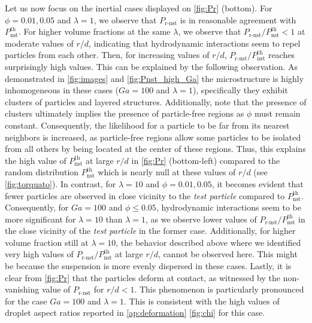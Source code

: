 Let us now focus on the inertial cases displayed on \ref{fig:Pr} (bottom). 
For $\phi = 0.01, 0.05$ and $\lambda=1$, we observe that $P_\text{r-nst}$ is in reasonable agreement with $P_\text{nst}^\text{th}$.  
For higher volume fractions at the same $\lambda$, we observe that $P_\text{r-nst}/P_\text{nst}^\text{th} < 1$ at moderate values of $r/d$,  indicating that hydrodynamic interactions seem to repel particles from each other. 
Then, for increasing values of $r/d$, $P_\text{r-nst}/P_\text{nst}^\text{th}$ reaches surprisingly high values.  
This can be explained by the following observation. 
As demonstrated in \ref{fig:images} and \ref{fig:Pnst_high_Ga} the microstructure is highly inhomogeneous in these cases ($Ga =100$ and $\lambda =1$), specifically they exhibit clusters of particles and layered structures.
Additionally, note that the presence of clusters ultimately implies the presence of particle-free regions as $\phi$ must remain constant. 
Consequently, the likelihood for a particle to be far from its nearest neighbors is increased, as particle-free regions allow some particles to be isolated from all others by being located at the center of these regions.
Thus, this explains the high value of $P_\text{nst}^\text{th}$ at large $r/d$ in \ref{fig:Pr} (bottom-left) compared to the random distribution $P_\text{nst}^\text{th}$ which is nearly null at these values of $r/d$ (see \ref{fig:torquato}). 
In contrast, for  $\lambda = 10$ and $\phi=0.01,0.05$, it becomes evident that fewer particles are observed in close vicinity to the \textit{test particle} compared to $P_\text{nst}^\text{th}$. 
Consequently, for $Ga = 100$ and $\phi \le 0.05$, hydrodynamic interactions seem to be more significant for $\lambda=10$ than $\lambda=1$, as we observe lower values of $P_\text{r-nst}/P_\text{nst}^\text{th}$ in the close vicinity of the \textit{test particle} in the former case.
Additionally, for higher volume fraction still at $\lambda = 10$, the behavior described above where we identified very high values of $P_\text{r-nst}/P_\text{nst}^\text{th}$ at large $r/d$, cannot be observed here.
This might be because the suspension is more evenly dispersed in these cases.  
Lastly, it is clear from \ref{fig:Pr} that the particles deform at contact, as witnessed by the non-vanishing value of $P_\text{r-nst}$ for $r/d<1$.
This phenomenon is particularly pronounced for the case $Ga = 100$ and $\lambda =1$. 
This is consistent with the high values of droplet aspect ratios reported in \ref{ap:deformation} \ref{fig:chi} for this case.



